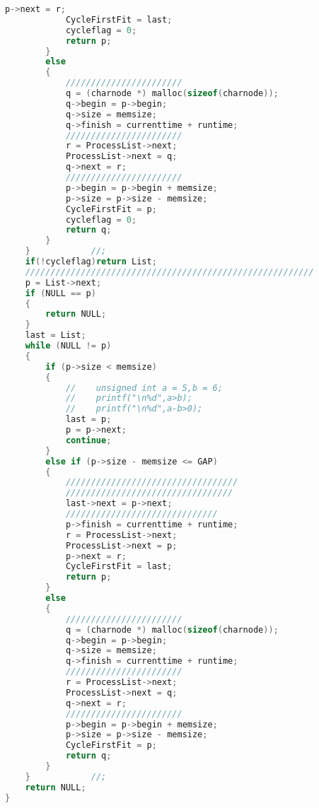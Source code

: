 \documentclass[UTF8]{ctexart}
\begin{document}
\begin{lstlisting}[language = C]
            p->next = r;
            CycleFirstFit = last;
            cycleflag = 0;
            return p;
        }
        else
        {
            ///////////////////////
            q = (charnode *) malloc(sizeof(charnode));
            q->begin = p->begin;
            q->size = memsize;
            q->finish = currenttime + runtime;
            ///////////////////////
            r = ProcessList->next;
            ProcessList->next = q;
            q->next = r;
            ///////////////////////
            p->begin = p->begin + memsize;
            p->size = p->size - memsize;
            CycleFirstFit = p;
            cycleflag = 0;
            return q;
        }
    }            //;
    if(!cycleflag)return List;
    /////////////////////////////////////////////////////////
    p = List->next;
    if (NULL == p)
    {
        return NULL;
    }
    last = List;
    while (NULL != p)
    {
        if (p->size < memsize)
        {
            //    unsigned int a = 5,b = 6;
            //    printf("\n%d",a>b);
            //    printf("\n%d",a-b>0);
            last = p;
            p = p->next;
            continue;
        }
        else if (p->size - memsize <= GAP)
        {
            //////////////////////////////////
            /////////////////////////////////
            last->next = p->next;
            //////////////////////////////
            p->finish = currenttime + runtime;
            r = ProcessList->next;
            ProcessList->next = p;
            p->next = r;
            CycleFirstFit = last;
            return p;
        }
        else
        {
            ///////////////////////
            q = (charnode *) malloc(sizeof(charnode));
            q->begin = p->begin;
            q->size = memsize;
            q->finish = currenttime + runtime;
            ///////////////////////
            r = ProcessList->next;
            ProcessList->next = q;
            q->next = r;
            ///////////////////////
            p->begin = p->begin + memsize;
            p->size = p->size - memsize;
            CycleFirstFit = p;
            return q;
        }
    }            //;
    return NULL;
}


\end{lstlisting}
\end{document}
